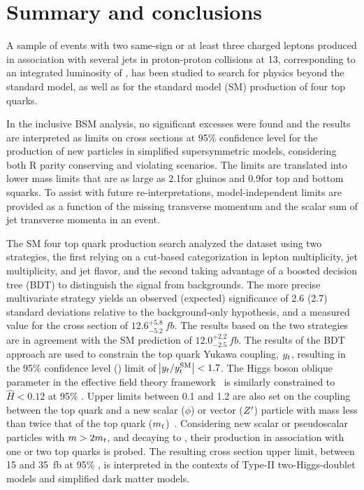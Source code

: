 \chapter{Summary and conclusions}
\label{chap:summary}

A sample of events with two same-sign or at least three charged leptons
produced in association with several jets in proton-proton collisions at
13\TeV, corresponding to an integrated luminosity of \sslumi, has been
studied to search for physics beyond the standard model, as well as for the
standard model (SM) production of four top quarks.

In the inclusive BSM analysis, no significant excesses were found and the
results are interpreted as limits on cross sections at 95\% confidence level
for the production of new particles in simplified supersymmetric models,
considering both R parity conserving and violating scenarios. The limits
are translated into lower mass limits that are as large as 2.1\TeV for
gluinos and 0.9\TeV for top and bottom squarks. 
To assist with future re-interpretations, model-independent limits are
provided as a function of the missing transverse momentum and the scalar sum
of jet transverse momenta in an event.

The SM four top quark production search analyzed the dataset using two
strategies, the first relying on a cut-based categorization in lepton
multiplicity, jet multiplicity, and jet flavor, and the second taking
advantage of a boosted decision tree (BDT) to distinguish the \tttt signal
from backgrounds. The more precise multivariate strategy yields an observed
(expected) significance of 2.6 (2.7) standard deviations relative to the
background-only hypothesis, and a measured value for the \tttt cross section
of $12.6^{+5.8}_{-5.2}~\unit{fb}$. The results based on the two strategies are
in agreement with the SM prediction of $12.0^{+2.2}_{-2.5}~\unit{fb}$. The
results of the BDT approach are used to constrain the top quark Yukawa
coupling, $y_{t}$, resulting in the 95\% confidence level (\CL) limit of
$\abs{y_{t}/y_{t}^{\mathrm{SM}}} < 1.7$. The Higgs boson oblique
parameter in the effective field theory
framework~\cite{THEORY:ObliqueHiggs2019} is similarly constrained to $\hat{H}
< 0.12$ at 95\% \CL. Upper limits between 0.1 and 1.2 are also set on the
coupling between the top quark and a new scalar ($\phi$) or vector ($Z^\prime$)
particle with mass less than twice that of the top quark
($m_t$)~\cite{THEORY:Alvarez2016nrz}. Considering new scalar or
pseudoscalar particles with $m > 2m_t$, and decaying to \ttbar,
their production in association with one or two top quarks is probed.
The resulting cross section upper limit, between 15 and
35~\unit{fb} at 95\% \CL, is interpreted in the contexts of Type-II
two-Higgs-doublet models and simplified dark matter models.

